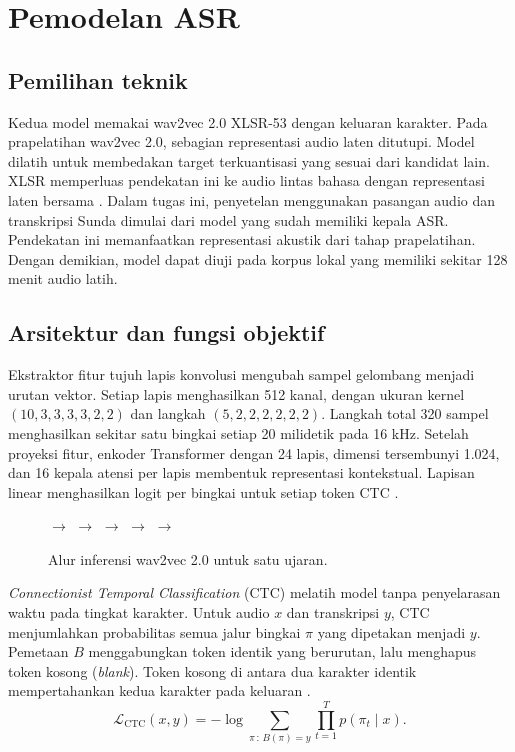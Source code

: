 \chapter{Pemodelan ASR}
\label{bab:pemodelan}

\section{Pemilihan teknik}

Kedua model memakai wav2vec 2.0 XLSR-53 dengan keluaran karakter. Pada prapelatihan wav2vec 2.0, sebagian representasi audio laten ditutupi. Model dilatih untuk membedakan target terkuantisasi yang sesuai dari kandidat lain. XLSR memperluas pendekatan ini ke audio lintas bahasa dengan representasi laten bersama \cite{baevski2020,conneau2021}. Dalam tugas ini, penyetelan menggunakan pasangan audio dan transkripsi Sunda dimulai dari model yang sudah memiliki kepala ASR. Pendekatan ini memanfaatkan representasi akustik dari tahap prapelatihan. Dengan demikian, model dapat diuji pada korpus lokal yang memiliki sekitar 128 menit audio latih.

\section{Arsitektur dan fungsi objektif}

Ekstraktor fitur tujuh lapis konvolusi mengubah sampel gelombang menjadi urutan vektor. Setiap lapis menghasilkan 512 kanal, dengan ukuran kernel $(10,3,3,3,3,2,2)$ dan langkah $(5,2,2,2,2,2,2)$. Langkah total 320 sampel menghasilkan sekitar satu bingkai setiap 20 milidetik pada 16 kHz. Setelah proyeksi fitur, enkoder Transformer dengan 24 lapis, dimensi tersembunyi 1.024, dan 16 kepala atensi per lapis membentuk representasi kontekstual. Lapisan linear menghasilkan logit per bingkai untuk setiap token CTC \cite{cahyamodel,nlpmodel,transformers}.

\begin{figure}[htbp]
  \centering
  \small
  \setlength{\fboxsep}{5pt}
  \(\rightarrow\)
  \(\rightarrow\)
  \(\rightarrow\)
  \(\rightarrow\)
  \(\rightarrow\)
  \caption{Alur inferensi wav2vec 2.0 untuk satu ujaran.}
  \label{fig:alur-asr}
\end{figure}

\textit{Connectionist Temporal Classification} (CTC) melatih model tanpa penyelarasan waktu pada tingkat karakter. Untuk audio \(x\) dan transkripsi \(y\), CTC menjumlahkan probabilitas semua jalur bingkai \(\pi\) yang dipetakan menjadi \(y\). Pemetaan \(B\) menggabungkan token identik yang berurutan, lalu menghapus token kosong (\textit{blank}). Token kosong di antara dua karakter identik mempertahankan kedua karakter pada keluaran \cite{graves2006}.
\begin{equation}
  \mathcal{L}_{\mathrm{CTC}}(x,y)
    = -\log \sum_{\pi\,:\,B(\pi)=y}
      \prod_{t=1}^{T} p(\pi_t \mid x).
\end{equation}

